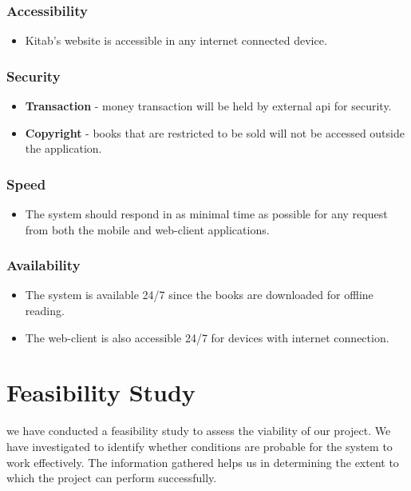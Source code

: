 	\subsubsection{Accessibility}
	\begin{itemize}
		\item Kitab's website is accessible in any internet connected device.
	\end{itemize}

	\subsubsection{Security}
	\begin{itemize}
		\item \textbf{Transaction} - money transaction will be held by external api for security.
		\item \textbf{Copyright} - books that are restricted to be sold will not be accessed outside the application.
	\end{itemize}

	\subsubsection{Speed}
	\begin{itemize}
		\item The system should respond in as minimal time as possible for any request from both the mobile and web-client applications.
	\end{itemize}

	\subsubsection{Availability}
	\begin{itemize}
		\item The system is available 24/7 since the books are downloaded for offline reading.
		\item The web-client is also accessible 24/7 for devices with internet connection.
	\end{itemize}

\section{Feasibility Study}
we have conducted a feasibility study to assess the viability of our project. We have investigated to identify whether conditions are probable for the system to work effectively. The information gathered helps us in determining the extent to which the project can perform successfully.

